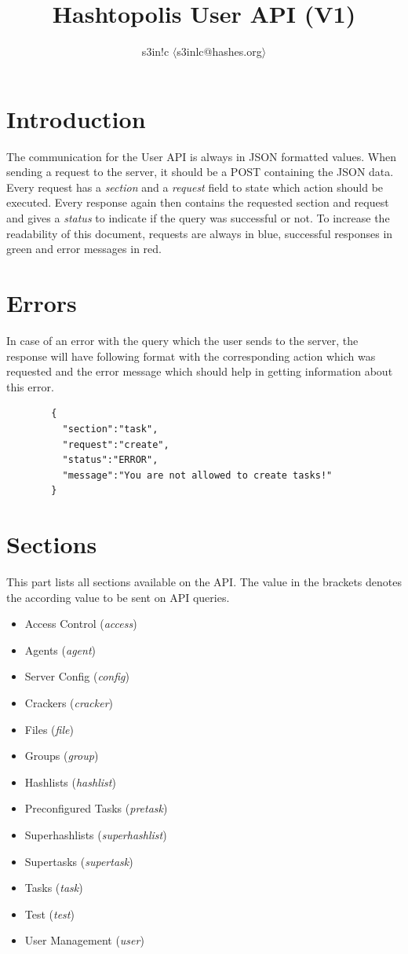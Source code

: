 \documentclass{article}
\author{s3in!c $\langle$s3inlc@hashes.org$\rangle$ }
\begin{document}
	\title{Hashtopolis User API (V1)}
	\maketitle
	\section*{Introduction}
	The communication for the User API is always in JSON formatted values. When sending a request to the server, it should be a POST containing the JSON data.
	Every request has a \textit{section} and a \textit{request} field to state which action should be executed. Every response again then contains the requested section and request and gives a \textit{status} to indicate if the query was successful or not. To increase the readability of this document, requests are always in blue, successful responses in green and error messages in red.

	\section*{Errors}
	In case of an error with the query which the user sends to the server, the response will have following format with the corresponding action which was requested and the error message which should help in getting information about this error.
	{	
		\color{BrickRed}
		\begin{verbatim}
		{
		  "section":"task",
		  "request":"create",
		  "status":"ERROR",
		  "message":"You are not allowed to create tasks!"
		}
		\end{verbatim}
	}
	
	\section*{Sections}
	This part lists all sections available on the API. The value in the brackets denotes the according value to be sent on API queries.
	\begin{itemize}
		\item{Access Control (\textit{access})}
		\item{Agents (\textit{agent})}
		\item{Server Config (\textit{config})}
		\item{Crackers (\textit{cracker})}
		\item{Files (\textit{file})}
		\item{Groups (\textit{group})}
		\item{Hashlists (\textit{hashlist})}
		\item{Preconfigured Tasks (\textit{pretask})}
		\item{Superhashlists (\textit{superhashlist})}
		\item{Supertasks (\textit{supertask})}
		\item{Tasks (\textit{task})}
		\item{Test (\textit{test})}
		\item{User Management (\textit{user})}
	\end{itemize}
	\pagebreak
\end{document}
